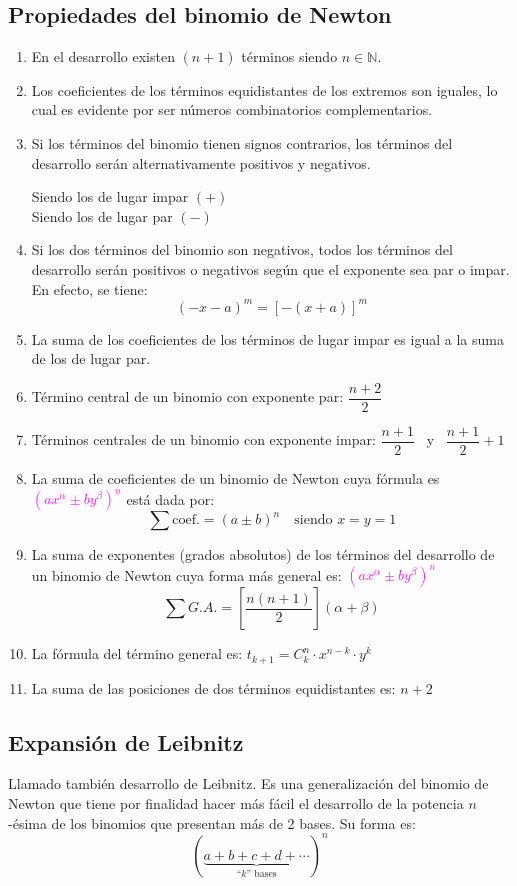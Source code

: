 \documentclass[11pt,a4paper]{article}
\newcommand{\cn}[1]{\raisebox{.5pt}{\textcircled{\raisebox{-.9pt}{\scriptsize #1}}}}
\newcommand{\hl}[1]{\textcolor{resaltado}{#1}}
\begin{document}
\subsection*{Propiedades del binomio de Newton}
\begin{enumerate}[label=\cn{\arabic*}]
  \item \hl{En el desarrollo existen $(n+1)$ términos siendo $n \in \mathbb{N}$.}
  \item Los coeficientes de los términos equidistantes de los extremos son iguales, lo
  cual es evidente por ser números combinatorios complementarios.
  \item Si los términos del binomio tienen signos contrarios, los términos del desarrollo
  serán alternativamente positivos y negativos.
  \begin{center}
  Siendo los de lugar impar \textcolor{rojo}{$(+)$}\\
  Siendo los de lugar par \textcolor{rojo}{$(-)$}
  \end{center}
  \item Si los dos términos del binomio son negativos, todos los términos del desarrollo
  serán positivos o negativos según que el exponente sea par o impar. En efecto, se tiene:
  \[(-x-a)^m = [-(x+a)]^m\]
  \item La suma de los coeficientes de los términos de lugar impar es igual a la suma de
  los de lugar par.
  \item Término central de un binomio con exponente par: $\dfrac{n+2}{2}$
  \item Términos centrales de un binomio con exponente impar: $\dfrac{n+1}{2}$ \ y \
  $\dfrac{n+1}{2} + 1$
  \item La suma de coeficientes de un binomio de Newton cuya fórmula es
  \textcolor{magenta}{$(ax^{\alpha} \pm by^{\beta})^n$} está dada por:
  \[\sum \text{coef.} = (a \pm b)^n \quad \text{siendo } x = y = 1\]
  \item La suma de exponentes (grados absolutos) de los términos del desarrollo de un
  binomio de Newton cuya forma más general es:
  \textcolor{magenta}{$(ax^{\alpha} \pm by^{\beta})^n$}
  \[\sum G.A. = \left[\frac{n(n+1)}{2}\right](\alpha + \beta)\]
  \item \hl{La fórmula del término general es: $t_{k+1} = C^{n}_{k}\cdot x^{n-k}\cdot y^{k}$}
  \item La suma de las posiciones de dos términos equidistantes es: $n + 2$
\end{enumerate}

\subsection*{Expansión de Leibnitz}
Llamado también desarrollo de Leibnitz. Es una generalización del binomio de Newton que
tiene por finalidad hacer más fácil el desarrollo de la potencia $n$-ésima de los
binomios que presentan más de 2 bases. Su forma es:
\[(\underbrace{a + b + c + d + \cdots}_{\text{``$k$'' bases}})^n\]
\end{document}

